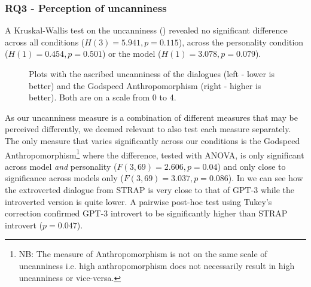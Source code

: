 \documentclass[nomenclature, english, biblatex]{kththesis}
\begin{document}
\subsubsection{RQ3 - Perception of uncanniness}
A Kruskal-Wallis test on the uncanniness () revealed no significant difference across all conditions ($H(3)=5.941, p=0.115$), across the personality condition ($H(1)=0.454, p=0.501$) or the model ($H(1)=3.078, p=0.079$). 

\begin{figure}[ht]
    \centering
    \begin{adjustbox}{max width=\textwidth}
        \begin{adjustbox}{max width=0.5\textwidth}
             
        \end{adjustbox}
        \begin{adjustbox}{max width=0.5\textwidth}
             
        \end{adjustbox}
    \end{adjustbox}
    \caption{Plots with the ascribed uncanniness of the dialogues (left - lower is better) and the Godspeed Anthropomorphism (right - higher is better). Both are on a scale from 0 to 4.}
    \label{fig:study_rq3}
\end{figure}
As our uncanniness measure is a combination of different measures that may be perceived differently, we deemed relevant to also test each measure separately. The only measure that varies significantly across our conditions is the Godspeed Anthropomorphism\footnote{NB: The measure of Anthropomorphism is not on the same scale of uncanniness i.e. high anthropomorphism does not necessarily result in high uncanniness or vice-versa.} where the difference, tested with ANOVA, is only significant across model \textit{and} personality ($F(3, 69)=2.606, p=0.04$) and only close to significance across models only ($F(3, 69)=3.037, p=0.086$). In  we can see how the extroverted dialogue from STRAP is very close to that of GPT-3 while the introverted version is quite lower. A pairwise post-hoc test using Tukey's correction confirmed GPT-3 introvert to be significantly higher than STRAP introvert ($p=0.047$).
\end{document}
